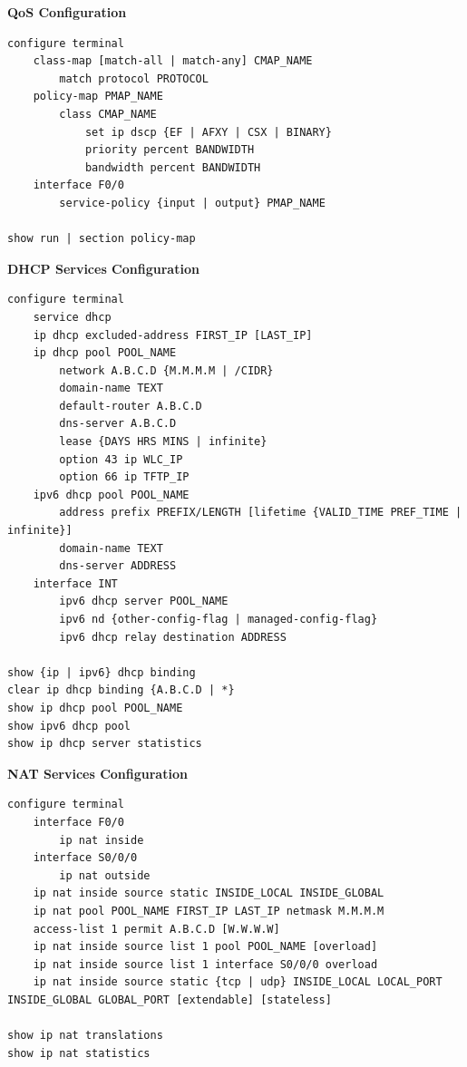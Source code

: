 \documentclass[12pt]{article}
\begin{document}
	\textbf{QoS Configuration}
	\begin{lstlisting}
configure terminal
	class-map [match-all | match-any] CMAP_NAME
		match protocol PROTOCOL
	policy-map PMAP_NAME
		class CMAP_NAME
			set ip dscp {EF | AFXY | CSX | BINARY}
			priority percent BANDWIDTH
			bandwidth percent BANDWIDTH
	interface F0/0
		service-policy {input | output} PMAP_NAME

show run | section policy-map
	\end{lstlisting}

	\textbf{DHCP Services Configuration}
	\begin{lstlisting}
configure terminal
	service dhcp
	ip dhcp excluded-address FIRST_IP [LAST_IP]
	ip dhcp pool POOL_NAME
		network A.B.C.D {M.M.M.M | /CIDR}
		domain-name TEXT
		default-router A.B.C.D
		dns-server A.B.C.D
		lease {DAYS HRS MINS | infinite}
		option 43 ip WLC_IP
		option 66 ip TFTP_IP
	ipv6 dhcp pool POOL_NAME
		address prefix PREFIX/LENGTH [lifetime {VALID_TIME PREF_TIME | infinite}]
		domain-name TEXT
		dns-server ADDRESS
	interface INT
		ipv6 dhcp server POOL_NAME
		ipv6 nd {other-config-flag | managed-config-flag}
		ipv6 dhcp relay destination ADDRESS

show {ip | ipv6} dhcp binding
clear ip dhcp binding {A.B.C.D | *}
show ip dhcp pool POOL_NAME
show ipv6 dhcp pool
show ip dhcp server statistics
	\end{lstlisting}

	\textbf{NAT Services Configuration}
	\begin{lstlisting}
configure terminal
	interface F0/0
		ip nat inside
	interface S0/0/0
		ip nat outside
	ip nat inside source static INSIDE_LOCAL INSIDE_GLOBAL
	ip nat pool POOL_NAME FIRST_IP LAST_IP netmask M.M.M.M
	access-list 1 permit A.B.C.D [W.W.W.W]
	ip nat inside source list 1 pool POOL_NAME [overload]
	ip nat inside source list 1 interface S0/0/0 overload
	ip nat inside source static {tcp | udp} INSIDE_LOCAL LOCAL_PORT INSIDE_GLOBAL GLOBAL_PORT [extendable] [stateless]

show ip nat translations
show ip nat statistics
	\end{lstlisting}
\end{document}
